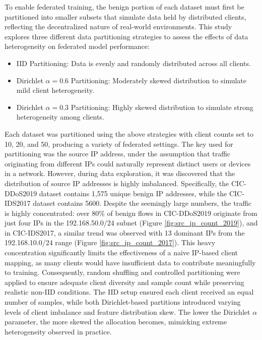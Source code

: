 To enable federated training, the benign portion of each dataset must first be partitioned into smaller subsets that simulate data held by distributed clients, reflecting the decentralized nature of real-world environments. This study explores three different data partitioning strategies to assess the effects of data heterogeneity on federated model performance:

\begin{itemize}
    \item IID Partitioning: Data is evenly and randomly distributed across all clients.
    \item Dirichlet $\alpha=0.6$ Partitioning: Moderately skewed distribution to simulate mild client heterogeneity.
    \item Dirichlet $\alpha=0.3$ Partitioning: Highly skewed distribution to simulate strong heterogeneity among clients.
\end{itemize}

Each dataset was partitioned using the above strategies with client counts set to 10, 20, and 50, producing a variety of federated settings. The key used for partitioning was the source IP address, under the assumption that traffic originating from different IPs could naturally represent distinct users or devices in a network. However, during data exploration, it was discovered that the distribution of source IP addresses is highly imbalanced. Specifically, the CIC-DDoS2019 dataset contains 1,575 unique benign IP addresses, while the CIC-IDS2017 dataset contains 5600. Despite the seemingly large numbers, the traffic is highly concentrated: over 80\% of benign flows in CIC-DDoS2019 originate from just four IPs in the 192.168.50.0/24 subnet (Figure \ref{fig:src_ip_count_2019}), and in CIC-IDS2017, a similar trend was observed with 13 dominant IPs from the 192.168.10.0/24 range (Figure \ref{fig:src_ip_count_2017}). This heavy concentration significantly limits the effectiveness of a naive IP-based client mapping, as many clients would have insufficient data to contribute meaningfully to training. Consequently, random shuffling and controlled partitioning were applied to ensure adequate client diversity and sample count while preserving realistic non-IID conditions. The IID setup ensured each client received an equal number of samples, while both Dirichlet-based partitions introduced varying levels of client imbalance and feature distribution skew. The lower the Dirichlet $\alpha$ parameter, the more skewed the allocation becomes, mimicking extreme heterogeneity observed in practice.

